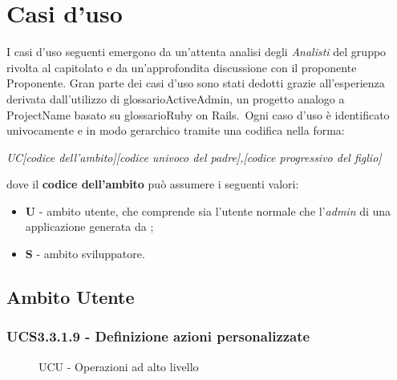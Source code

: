 \section{Casi d'uso}
I casi d'uso seguenti emergono da un'attenta analisi degli \textit{Analisti} del gruppo \GroupName{} rivolta al capitolato e da un'approfondita discussione con il proponente Proponente{}. Gran parte dei casi d'uso sono stati dedotti grazie all'esperienza derivata dall'utilizzo di glossario{ActiveAdmin}, un progetto analogo a ProjectName{} basato su glossario{Ruby on Rails}.\
Ogni caso d'uso è identificato univocamente e in modo gerarchico tramite una codifica nella forma:

\begin{center}

\textit{UC[codice dell'ambito][codice univoco del padre],[codice progressivo del figlio]}

\end{center} 

dove il \textbf{codice dell'ambito} può assumere i seguenti valori:

\begin{itemize}

  \item \textbf{U} - ambito utente, che comprende sia l'utente normale che l'\textit{admin} di una applicazione generata da \ProjectName{};
  \item \textbf{S} - ambito sviluppatore.

\end{itemize}

\subsection{Ambito Utente}
\subsubsection{UCS3.3.1.9 - Definizione azioni personalizzate}
    
    \begin{figure}[H]
      \caption{UCU - Operazioni ad alto livello} 
    \end{figure}
      
